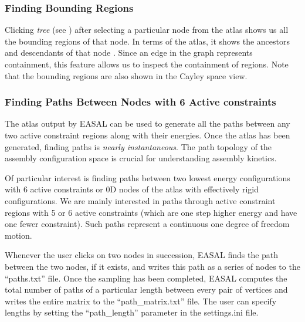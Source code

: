 \documentclass[10pt]{article}
\begin{document}
\subsubsection{Finding Bounding Regions} 
Clicking \emph{tree} (see ) after selecting a particular node from
the atlas shows us all the bounding regions of that node. In terms of the atlas, it shows  
the ancestors and descendants of that node . Since an edge in the graph represents 
containment, this feature allows us to inspect the containment of regions.
Note that the bounding regions are also shown in the Cayley space view.

\subsubsection{Finding Paths Between Nodes with 6 Active constraints}
The atlas output by EASAL can be used to generate all the paths between any two active
constraint regions along with their energies. Once the atlas has been generated, 
finding paths is \emph{nearly instantaneous}. The path topology of 
the assembly configuration space is crucial for understanding assembly kinetics.

Of particular interest is finding paths between two lowest energy
configurations with 6 active constraints or 0D nodes of the atlas with effectively rigid 
configurations. We are mainly interested in paths through active constraint regions with 5 
or 6 active constraints (which are one step higher energy and have one fewer constraint). 
Such paths represent a continuous one degree of freedom motion.

Whenever the user clicks on two nodes in succession, EASAL finds the path between the two 
nodes, if it exists, and writes this path as a series of nodes to the 
``paths.txt'' file. Once the sampling has been completed, EASAL computes the total number of paths of a particular length between every pair of vertices and writes the entire matrix to the ``path\_matrix.txt'' file. The user can specify lengths by setting the ``path\_length'' parameter in the settings.ini file.
\end{document}
